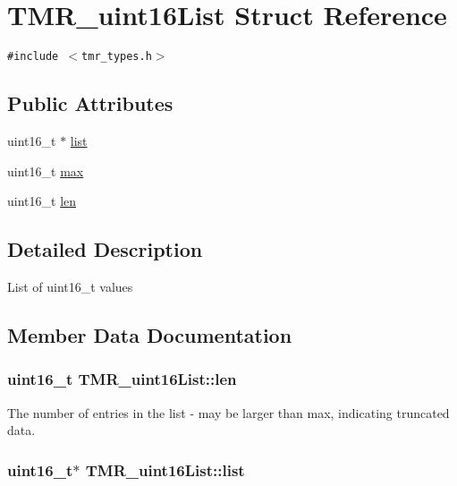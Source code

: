 \hypertarget{struct_t_m_r__uint16_list}{
\section{TMR\_\-uint16List Struct Reference}
\label{struct_t_m_r__uint16_list}
}
{\tt \#include $<$tmr\_\-types.h$>$}

\subsection*{Public Attributes}
\begin{CompactItemize}
\item 
uint16\_\-t $\ast$ \hyperlink{struct_t_m_r__uint16_list_d5e0b2ab3d64b5c322b2d4a7481e6bcc}{list}
\item 
uint16\_\-t \hyperlink{struct_t_m_r__uint16_list_ad0c0d75bab47fbcb4e1d99845dc9a84}{max}
\item 
uint16\_\-t \hyperlink{struct_t_m_r__uint16_list_30296cbaa374b6eaab1639158ae5c8c1}{len}
\end{CompactItemize}


\subsection{Detailed Description}
List of uint16\_\-t values 

\subsection{Member Data Documentation}
\hypertarget{struct_t_m_r__uint16_list_30296cbaa374b6eaab1639158ae5c8c1}{
\subsubsection[{len}]{\setlength{\rightskip}{0pt plus 5cm}uint16\_\-t {\bf TMR\_\-uint16List::len}}}
\label{struct_t_m_r__uint16_list_30296cbaa374b6eaab1639158ae5c8c1}


The number of entries in the list - may be larger than max, indicating truncated data. \hypertarget{struct_t_m_r__uint16_list_d5e0b2ab3d64b5c322b2d4a7481e6bcc}{
\subsubsection[{list}]{\setlength{\rightskip}{0pt plus 5cm}uint16\_\-t$\ast$ {\bf TMR\_\-uint16List::list}}}
\label{struct_t_m_r__uint16_list_d5e0b2ab3d64b5c322b2d4a7481e6bcc}


